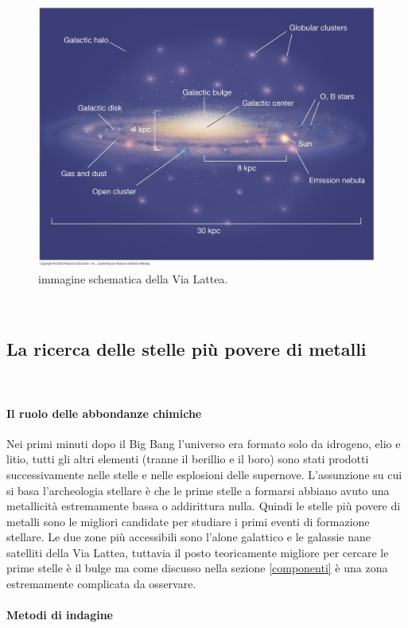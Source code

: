 \documentclass[12pt]{article}
\begin{document}
\begin{figure}[htp!]
\center
  \includegraphics[width=
0.8 \textwidth]{galassia}
  \caption{immagine schematica della Via Lattea. }
  \label{galassia}
\end{figure}
\
\newpage
\subsection{La ricerca delle stelle più povere di metalli}
\

\paragraph{Il ruolo delle abbondanze chimiche}

Nei primi minuti dopo il Big Bang l’universo era formato solo da idrogeno, elio e litio, tutti gli altri elementi (tranne il berillio e il boro) sono stati prodotti successivamente nelle stelle e nelle esplosioni delle supernove. L’assunzione su cui si basa l’archeologia stellare è che le prime stelle a formarsi abbiano avuto una metallicità estremamente bassa o addirittura nulla. Quindi le stelle più povere di metalli sono le migliori candidate per studiare i primi eventi di formazione stellare. Le due zone più accessibili sono l’alone galattico e le galassie nane satelliti della Via Lattea, tuttavia il posto teoricamente migliore per cercare le prime stelle è il bulge ma come discusso nella sezione \ref{componenti} è una zona estremamente complicata da osservare.

\paragraph{Metodi di indagine}
\end{document}
